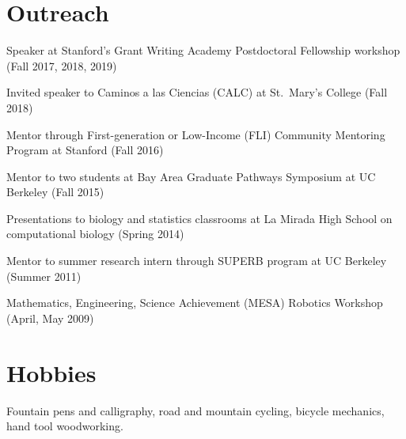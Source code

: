 \documentclass[11pt,notitlepage]{article} %
\begin{document}
\section*{Outreach}
\medskip
Speaker at Stanford's Grant Writing Academy Postdoctoral Fellowship workshop (Fall 2017, 2018, 2019)

\medskip
Invited speaker to Caminos a las Ciencias (CALC) at St.\ Mary's College (Fall 2018)

\medskip

Mentor through First-generation or Low-Income (FLI) Community Mentoring Program at Stanford (Fall 2016)

\medskip

Mentor to two students at Bay Area Graduate Pathways Symposium at UC Berkeley (Fall 2015)

\medskip
Presentations to biology and statistics classrooms at La Mirada High School on
computational biology (Spring 2014)

\medskip

Mentor to summer research intern through SUPERB program at UC Berkeley (Summer
2011)

\medskip

Mathematics, Engineering, Science Achievement (MESA) Robotics Workshop (April, May 2009)

\bigskip
\section*{Hobbies}
\medskip
Fountain pens and calligraphy, road and mountain cycling, bicycle mechanics, hand tool woodworking.
\end{document}
